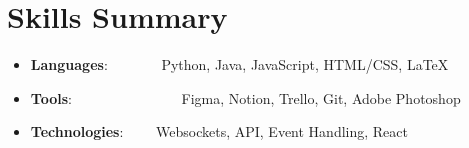 \documentclass[a4paper,11pt]{extarticle}
\newcommand{\resumeSkillItem}[2]{
	\item\small{
		\textbf{#1}{: #2 \vspace{-2pt}}
	}
}
\newcommand{\resumeSubItem}[2]{\resumeSkillItem{#1}{#2}\vspace{-5pt}}
\newcommand{\resumeSubHeadingListStart}{\begin{itemize}[leftmargin=0.15in,label={}]}
\newcommand{\resumeSubHeadingListEnd}{\end{itemize}}
\begin{document}
\section{Skills Summary}
	\resumeSubHeadingListStart
		\resumeSubItem{Languages}
			{\hspace{0.6mm}~~~~~~~Python, Java, JavaScript, HTML/CSS, \LaTeX}
		\resumeSubItem{Tools}
            {\hspace{0.3mm}~~~~~~~~~~~~~~~Figma, Notion, Trello, Git, Adobe
                Photoshop}
		\resumeSubItem{Technologies}
			{~~~~Websockets, API, Event Handling, React}
	\resumeSubHeadingListEnd
\end{document}
